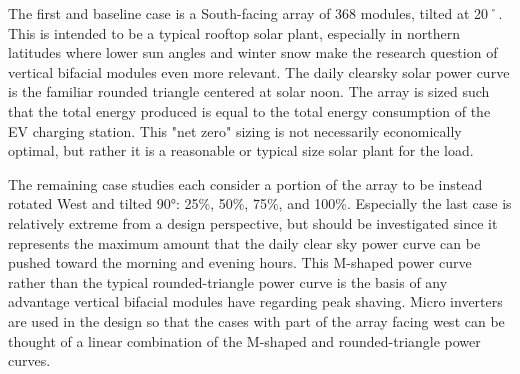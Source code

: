\documentclass[
]{article}
\begin{document}
The first and baseline case is a South-facing array of 368 modules,
tilted at 20˚. This is intended to be a typical rooftop solar plant,
especially in northern latitudes where lower sun angles and winter snow
make the research question of vertical bifacial modules even more
relevant. The daily clearsky solar power curve is the familiar rounded
triangle centered at solar noon. The array is sized such that the total
energy produced is equal to the total energy consumption of the EV
charging station. This "net zero" sizing is not necessarily economically
optimal, but rather it is a reasonable or typical size solar plant for
the load.

The remaining case studies each consider a portion of the array to be
instead rotated West and tilted 90°: 25\%, 50\%, 75\%, and 100\%.
Especially the last case is relatively extreme from a design
perspective, but should be investigated since it represents the maximum
amount that the daily clear sky power curve can be pushed toward the
morning and evening hours. This M-shaped power curve rather than the
typical rounded-triangle power curve is the basis of any advantage
vertical bifacial modules have regarding peak shaving. Micro inverters
are used in the design so that the cases with part of the array facing
west can be thought of a linear combination of the M-shaped and
rounded-triangle power curves.
\end{document}
